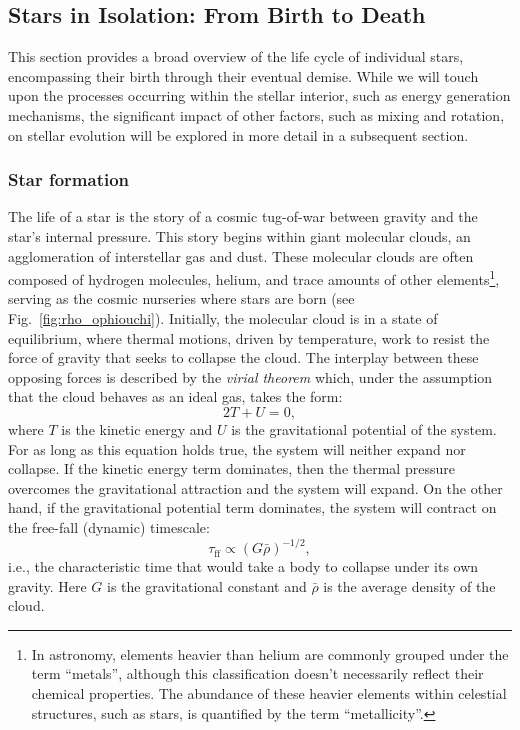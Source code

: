 \documentclass[main.tex]{subfiles}
\begin{document}
    

    \newpage
    \subsection{Stars in Isolation: From Birth to Death}
    This section provides a broad overview of the life cycle of individual stars, encompassing their birth through their eventual demise. While we will touch upon the processes occurring within the stellar interior, such as energy generation mechanisms, the significant impact of other factors, such as mixing and rotation, on stellar evolution will be explored in more detail in a subsequent section.
    
    \subsubsection{Star formation}
    The life of a star is the story of a cosmic tug-of-war between gravity and the star's internal pressure. This story begins within giant molecular clouds, an agglomeration of interstellar gas and dust. These molecular clouds are often composed of hydrogen molecules, helium, and trace amounts of other elements\footnote{In astronomy, elements heavier than helium are commonly grouped under the term ``metals'', although this classification doesn't necessarily reflect their chemical properties. The abundance of these heavier elements within celestial structures, such as stars, is quantified by the term ``metallicity''.}, serving as the cosmic nurseries where stars are born (see Fig.~\ref{fig:rho_ophiouchi}).
    Initially, the molecular cloud is in a state of equilibrium, where thermal motions, driven by temperature, work to resist the force of gravity that seeks to collapse the cloud. The interplay between these opposing forces is described by the \textit{virial theorem} which, under the assumption that the cloud behaves as an ideal gas, takes the form:
    \begin{equation}\label{eq:virial}
        2T + U = 0,
    \end{equation}
    where $T$ is the kinetic energy and $U$ is the gravitational potential of the system. For as long as this equation holds true, the system will neither expand nor collapse. If the kinetic energy term dominates, then the thermal pressure overcomes the gravitational attraction and the system will expand. On the other hand, if the gravitational potential term dominates, the system will contract on the free-fall (dynamic) timescale:
    \begin{equation}\label{eq:dynamical_timescale}
        \tau_\mathrm{ff} \propto (G\bar{\rho})^{-1/2},
    \end{equation}
    i.e., the characteristic time that would take a body to collapse under its own gravity. Here $G$ is the gravitational constant and $\bar{\rho}$ is the average density of the cloud.
\end{document}
